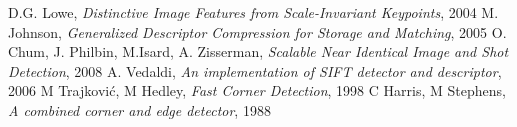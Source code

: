 \documentclass[conference]{IEEEtran}
\begin{document}
%
%
%
\begin{thebibliography}{1}

D.G. Lowe, \emph{Distinctive Image Features from Scale-Invariant Keypoints}, 2004
M. Johnson, \emph{Generalized Descriptor Compression for Storage and Matching}, 2005
O. Chum, J. Philbin, M.Isard, A. Zisserman, \emph{Scalable Near Identical Image and Shot Detection}, 2008
A. Vedaldi, \emph{An implementation of SIFT detector and descriptor}, 2006
M Trajković, M Hedley, \emph{Fast Corner Detection}, 1998
C Harris, M Stephens, \emph{A combined corner and edge detector}, 1988
\end{thebibliography}
\end{document}
